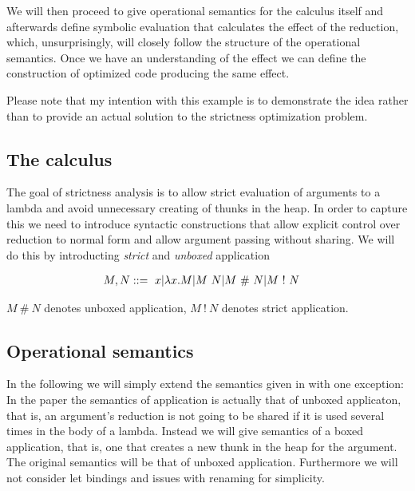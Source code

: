 \documentclass[a4paper]{article}
\begin{document}
We will then proceed to give operational semantics for the calculus itself and afterwards define symbolic evaluation that calculates the effect of the reduction, which, unsurprisingly, will closely follow the structure of the operational semantics. Once we have an understanding of the effect we can define the construction of optimized code producing the same effect.

Please note that my intention with this example is to demonstrate the idea rather than to provide an actual solution to the strictness optimization problem.

\subsection{The calculus}

The goal of strictness analysis is to allow strict evaluation of arguments to a lambda and avoid unnecessary creating of thunks in the heap. In order to capture this we need to introduce syntactic constructions that allow explicit control over reduction to normal form and allow argument passing without sharing. We will do this by introducting \emph{strict} and \emph{unboxed} application

\newcommand{\strict}{\ !\ }
\newcommand{\unboxed}{\ \#\ }

\begin{align}
  M,N&::=\ x|\lambda x.M|M \app N|M \unboxed N|M \strict N
\end{align}

$M \unboxed N$ denotes unboxed application, $M \strict N$ denotes strict application.

\subsection{Operational semantics}

In the following we will simply extend the semantics given in \cite{Launchbury:1993:NSL:158511.158618} with one exception: In the paper the semantics of application is actually that of unboxed applicaton, that is, an argument's reduction is not going to be shared if it is used several times in the body of a lambda. Instead we will give semantics of a boxed application, that is, one that creates a new thunk in the heap for the argument. The original semantics will be that of unboxed application. Furthermore we will not consider let bindings and issues with renaming for simplicity.
\end{document}
